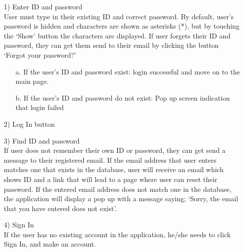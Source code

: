 \documentclass[conference]{IEEEtran}
\begin{document}
\begin{itemize}
    \item[1)] Enter ID and password \\
    User must type in their existing ID and correct password. By default, user’s password is hidden and characters are shown as asterisks (*),  but by touching the ‘Show’ button the characters are displayed. If user forgets their ID and password, they can get them send to their email by clicking the button ‘Forgot your password?’
    \begin{itemize}
        \item[a.] If the user’s ID and password exist: login successful and move on to the main page.
        \item[b.] If the user’s ID and password do not exist: Pop up screen indication that login failed
    \end{itemize}
    \item[2)] Log In button
    \item[3)] Find ID and password \\
    If user does not remember their own ID or password, they can get send a message to their registered email. If the email address that user enters matches one that exists in the database, user will receive an email which shows ID and a link that will lead to a page where user can reset their password. If the entered email address does not match one in the database, the application will display a pop up with a message saying; ‘Sorry, the email that you have entered does not exist’.
    \item[4)] Sign In \\
    If the user has no existing account in the application, he/she needs to click Sign In, and make an account.
\end{itemize}
\end{document}
